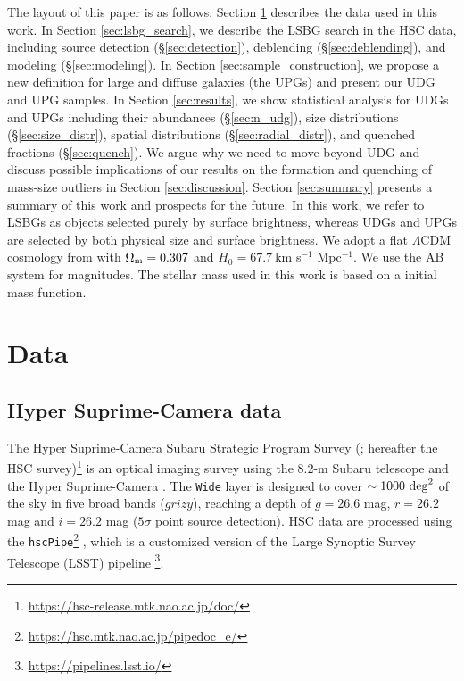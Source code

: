 \documentclass[twocolumn,astrosymb,twocolappendix]{aastex631}
\newcommand{\code}[1]{\texttt{#1}}
\begin{document}
\begin{CJK*}{UTF8}{gbsn}
The layout of this paper is as follows. Section \ref{sec:data} describes the data used in this work. In Section \ref{sec:lsbg_search}, we describe the LSBG search in the HSC data, including source detection (\S \ref{sec:detection}), deblending (\S \ref{sec:deblending}), and modeling (\S \ref{sec:modeling}). In Section \ref{sec:sample_construction}, we propose a new definition for large and diffuse galaxies (the UPGs) and present our UDG and UPG samples. In Section \ref{sec:results}, we show statistical analysis for UDGs and UPGs including their abundances (\S \ref{sec:n_udg}), size distributions (\S \ref{sec:size_distr}), spatial distributions (\S \ref{sec:radial_distr}), and quenched fractions (\S \ref{sec:quench}). We argue why we need to move beyond UDG and discuss possible implications of our results on the formation and quenching of mass-size outliers in Section \ref{sec:discussion}. Section \ref{sec:summary} presents a summary of this work and prospects for the future. In this work, we refer to LSBGs as objects selected purely by surface brightness, whereas UDGs and UPGs are selected by both physical size and surface brightness. We adopt a flat $\Lambda$CDM cosmology from \citet{Planck15} with $\Omega_{\rm m}= 0.307$ and $H_0 = 67.7\ $km s$^{-1}$ Mpc$^{-1}$. We use the AB system \citep{Oke1983} for magnitudes. The stellar mass used in this work is based on a \citet{Chabrier2003} initial mass function.


\section{Data} \label{sec:data}
\subsection{Hyper Suprime-Camera data}
The Hyper Suprime-Camera Subaru Strategic Program Survey (\citealt{Aihara2018}; hereafter the HSC survey)\footnote{\url{https://hsc-release.mtk.nao.ac.jp/doc/}} is an optical imaging survey using the 8.2-m Subaru telescope and the Hyper Suprime-Camera \citep{Miyazaki2012, Miyazaki2018}. The \texttt{Wide} layer is designed to cover $\sim 1000\ \rm{deg}^{2}$ of the sky in five broad bands ($grizy$), reaching a depth of $g=26.6$ mag, $r=26.2$ mag and $i=26.2$ mag ($5\sigma$ point source detection). HSC data are processed using the \code{hscPipe}\footnote{\url{https://hsc.mtk.nao.ac.jp/pipedoc_e/}} \citep{Bosch2018}, which is a customized version of the Large Synoptic Survey Telescope (LSST) pipeline \citep{LSST-pipeline}\footnote{\url{https://pipelines.lsst.io/}}.


\end{CJK*}
\end{document}
